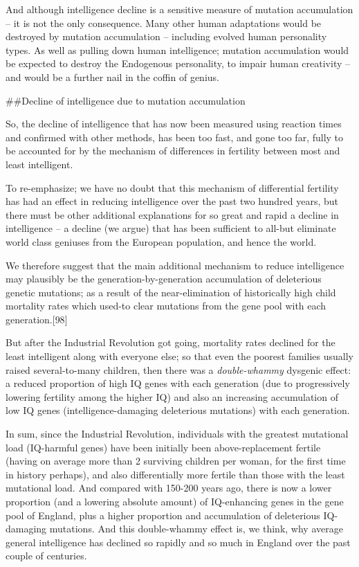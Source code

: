\documentclass[
]{book}
\begin{document}
And although intelligence decline is a sensitive measure of mutation accumulation -- it is not the only consequence. Many other human adaptations would be destroyed by mutation accumulation -- including evolved human personality types. As well as pulling down human intelligence; mutation accumulation would be expected to destroy the Endogenous personality, to impair human creativity -- and would be a further nail in the coffin of genius.

\#\#Decline of intelligence due to mutation accumulation

So, the decline of intelligence that has now been measured using reaction times and confirmed with other methods, has been too fast, and gone too far, fully to be accounted for by the mechanism of differences in fertility between most and least intelligent.

To re-emphasize; we have no doubt that this mechanism of differential fertility has had an effect in reducing intelligence over the past two hundred years, but there must be other additional explanations for so great and rapid a decline in intelligence -- a decline (we argue) that has been sufficient to all-but eliminate world class geniuses from the European population, and hence the world.

We therefore suggest that the main additional mechanism to reduce intelligence may plausibly be the generation-by-generation accumulation of deleterious genetic mutations; as a result of the near-elimination of historically high child mortality rates which used-to clear mutations from the gene pool with each generation.{[}98{]}

But after the Industrial Revolution got going, mortality rates declined for the least intelligent along with everyone else; so that even the poorest families usually raised several-to-many children, then there was a \emph{double-whammy} dysgenic effect: a reduced proportion of high IQ genes with each generation (due to progressively lowering fertility among the higher IQ) and also an increasing accumulation of low IQ genes (intelligence-damaging deleterious mutations) with each generation.

In sum, since the Industrial Revolution, individuals with the greatest mutational load (IQ-harmful genes) have been initially been above-replacement fertile (having on average more than 2 surviving children per woman, for the first time in history perhaps), and also differentially more fertile than those with the least mutational load. And compared with 150-200 years ago, there is now a lower proportion (and a lowering absolute amount) of IQ-enhancing genes in the gene pool of England, plus a higher proportion and accumulation of deleterious IQ-damaging mutations. And this double-whammy effect is, we think, why average general intelligence has declined so rapidly and so much in England over the past couple of centuries.
\end{document}
